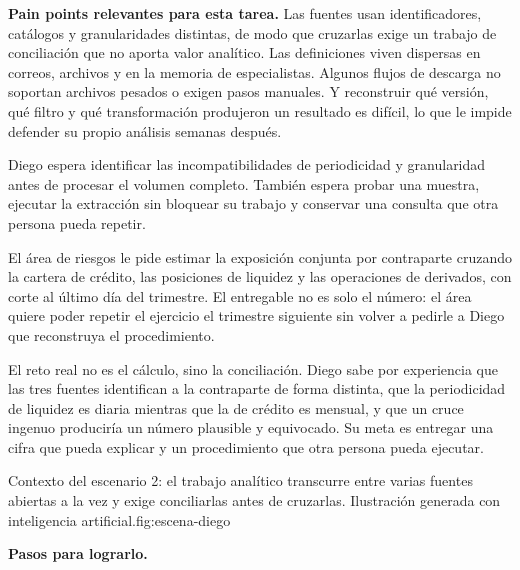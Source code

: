 \textbf{\textcolor{uxnavy}{Pain points relevantes para esta tarea.}} Las fuentes usan
identificadores, catálogos y granularidades distintas, de modo que cruzarlas exige un trabajo
de conciliación que no aporta valor analítico. Las definiciones viven dispersas en correos,
archivos y en la memoria de especialistas. Algunos flujos de descarga no soportan archivos
pesados o exigen pasos manuales. Y reconstruir qué versión, qué filtro y qué transformación
produjeron un resultado es difícil, lo que le impide defender su propio análisis semanas
después.


Diego espera identificar las incompatibilidades de periodicidad y granularidad antes de
procesar el volumen completo. También espera probar una muestra, ejecutar la extracción sin
bloquear su trabajo y conservar una consulta que otra persona pueda repetir.


El área de riesgos le pide estimar la exposición conjunta por contraparte cruzando la cartera
de crédito, las posiciones de liquidez y las operaciones de derivados, con corte al último día
del trimestre. El entregable no es solo el número: el área quiere poder repetir el ejercicio
el trimestre siguiente sin volver a pedirle a Diego que reconstruya el procedimiento.

El reto real no es el cálculo, sino la conciliación. Diego sabe por experiencia que las tres
fuentes identifican a la contraparte de forma distinta, que la periodicidad de liquidez es
diaria mientras que la de crédito es mensual, y que un cruce ingenuo produciría un número
plausible y equivocado. Su meta es entregar una cifra que pueda explicar y un procedimiento
que otra persona pueda ejecutar.

  {Contexto del escenario 2: el trabajo analítico transcurre entre varias fuentes abiertas a
   la vez y exige conciliarlas antes de cruzarlas. Ilustración generada con inteligencia
   artificial.}{fig:escena-diego}

\textbf{\textcolor{uxnavy}{Pasos para lograrlo.}}

